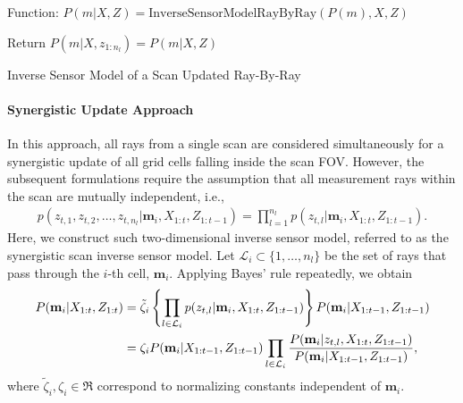 \vspace*{0.05\columnwidth}
\begin{algorithm}[H]
	Function: $P(m|X,Z)=\text{InverseSensorModelRayByRay}(P(m),X,Z)$\;
	
	Return $P(m|X,z_{1:n_{l}})=P(m|X,Z)$\;
\caption{Inverse Sensor Model of a Scan Updated Ray-By-Ray}
\label{alg:RayByRayISM}
\end{algorithm}
\vspace*{0.05\columnwidth}
\newpage





\paragraph{Synergistic Update Approach}

In this approach, all rays from a single scan are considered simultaneously for a synergistic update of all grid cells falling inside the scan FOV. However, the subsequent formulations require the assumption that all measurement rays within the scan are mutually independent, i.e.,
\begin{align*}
p(z_{t,1},z_{t,2},\ldots,z_{t,n_l}|\mathbf{m}_i,X_{1:t},Z_{1:t-1})=\prod_{l=1}^{n_l}p(z_{t,l}|\mathbf{m}_i,X_{1:t},Z_{1:t-1}).
\end{align*}
Here, we construct such two-dimensional inverse sensor model, referred to as the synergistic scan inverse sensor model.
Let $\mathcal L_i\subset\{1,\ldots, n_l\}$ be the set of rays that pass through the $i$-th cell, $\mathbf{m}_i$. Applying Bayes' rule repeatedly, we obtain
\begin{align}
P(\mathbf{m}_i|X_{1:t},Z_{1:t})
&=\tilde\zeta_i\braces{\prod_{l\in\mathcal{L}_i}p(z_{t,l}|\mathbf{m}_i,X_{1:t},Z_{1:t-1})}P(\mathbf{m}_i|X_{1:t-1},Z_{1:t-1})\nonumber\\
&=
\zeta_i P(\mathbf{m}_i|X_{1:t-1},Z_{1:t-1})%
\prod_{l\in\mathcal{L}_i}\frac{P(\mathbf{m}_i|z_{t,l},X_{1:t},Z_{1:t-1})}{P(\mathbf{m}_i|X_{1:t-1},Z_{1:t-1})},
\label{eqn:ThirdBayesRule}
\end{align}
where $\tilde\zeta_i,\zeta_i\in\Re$ correspond to normalizing constants independent of $\mathbf{m}_i$. 

